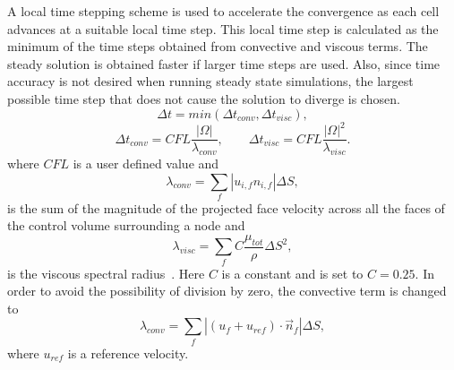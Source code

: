 
A local time stepping scheme is used to accelerate the convergence as each cell advances at a suitable local time step. This local time step is calculated as the minimum of the time steps obtained from convective and viscous terms. The steady solution is obtained faster if larger time steps are used. Also, since time accuracy is not desired when running steady state simulations, the largest possible time step that does not cause the solution to diverge is chosen.
\begin{equation}
\Delta t = min(\Delta t_{conv}, \Delta t_{visc}),
\end{equation}
\begin{equation}
\Delta t_{conv} = CFL\frac{|\Omega|}{\lambda_{conv}}, \qquad
\Delta t_{visc} = CFL\frac{|\Omega|^2}{\lambda_{visc}}.
\end{equation}
where $CFL$ is a user defined value and
\begin{equation}
\lambda_{conv} = \sum_{f}|u_{i,f} n_{i,f}|\Delta S,
\end{equation}
is the sum of the magnitude of the projected face velocity across all the faces of the control volume surrounding a node and 
\begin{equation}
\lambda_{visc} = \sum_{f}C\frac{\mu_{tot}}{\rho}\Delta S^2,
\end{equation}
is the viscous spectral radius~\cite{SU22014}. Here $C$ is a constant and is set to $C=0.25$. In order to avoid the possibility of division by zero, the convective term is changed to 
\begin{equation}
\lambda_{conv} = \sum_{f}|(u_f + u_{ref}) \cdot \vec{n}_f|\Delta S,
\end{equation}
where $u_{ref}$ is a reference velocity. 
